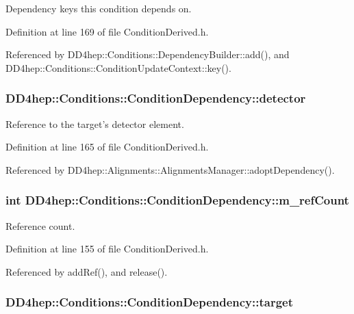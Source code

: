 Dependency keys this condition depends on. 

Definition at line 169 of file ConditionDerived.h.

Referenced by DD4hep::Conditions::DependencyBuilder::add(), and DD4hep::Conditions::ConditionUpdateContext::key().\hypertarget{class_d_d4hep_1_1_conditions_1_1_condition_dependency_a967bc771b0504b80f8ecfa879e03e498}{
\subsubsection[{detector}]{ {\bf DD4hep::Conditions::ConditionDependency::detector}}}
\label{class_d_d4hep_1_1_conditions_1_1_condition_dependency_a967bc771b0504b80f8ecfa879e03e498}


Reference to the target's detector element. 

Definition at line 165 of file ConditionDerived.h.

Referenced by DD4hep::Alignments::AlignmentsManager::adoptDependency().\hypertarget{class_d_d4hep_1_1_conditions_1_1_condition_dependency_a0962b46c90825f3ee632af2a25520639}{
\subsubsection[{m\_\-refCount}]{\setlength{\rightskip}{0pt plus 5cm}int {\bf DD4hep::Conditions::ConditionDependency::m\_\-refCount}}}
\label{class_d_d4hep_1_1_conditions_1_1_condition_dependency_a0962b46c90825f3ee632af2a25520639}


Reference count. 

Definition at line 155 of file ConditionDerived.h.

Referenced by addRef(), and release().\hypertarget{class_d_d4hep_1_1_conditions_1_1_condition_dependency_a1a6c5ef0f44fa4c97fda1f750dd81dc2}{
\subsubsection[{target}]{ {\bf DD4hep::Conditions::ConditionDependency::target}}}
\label{class_d_d4hep_1_1_conditions_1_1_condition_dependency_a1a6c5ef0f44fa4c97fda1f750dd81dc2}


